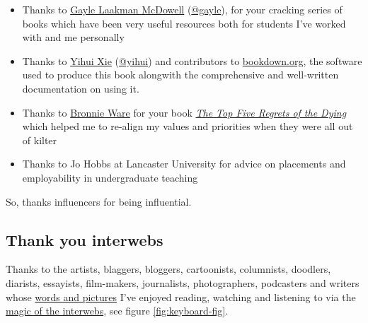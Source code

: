 \documentclass[
]{book}
\providecommand{\tightlist}{%
  \setlength{\itemsep}{0pt}\setlength{\parskip}{0pt}}
\begin{document}
\begin{itemize}
\tightlist
\item
  Thanks to \href{https://en.wikipedia.org/wiki/Gayle_Laakmann_McDowell}{Gayle Laakman McDowell} (\href{https://twitter.com/gayle}{@gayle}), for your cracking series of books \citep{techcareer, cracking, crackingpm, crackingthepmcareer} which have been very useful resources both for students I've worked with and me personally
\item
  Thanks to \href{https://en.wikipedia.org/wiki/Yihui_Xie}{Yihui Xie} (\href{https://github.com/yihui}{@yihui}) and contributors to \href{https://bookdown.org}{bookdown.org}, the software used to produce this book alongwith the comprehensive and well-written documentation on using it. \citep{xie2017, xie2015, xie2020}
\item
  Thanks to \href{https://en.wikipedia.org/wiki/Bronnie_Ware}{Bronnie Ware} for your book \emph{\href{https://en.wikipedia.org/wiki/The_Top_Five_Regrets_of_the_Dying}{The Top Five Regrets of the Dying}} \citep{regrets} which helped me to re-align my values and priorities when they were all out of kilter
\item
  Thanks to Jo Hobbs at Lancaster University for advice on placements and employability in undergraduate teaching
\end{itemize}

So, thanks influencers for being influential. 🙏

\hypertarget{bloggers}{%
\subsection{Thank you interwebs}\label{bloggers}}

Thanks to the artists, blaggers, bloggers, cartoonists, columnists, doodlers, diarists, essayists, film-makers, journalists, photographers, podcasters and writers whose \href{https://en.wikipedia.org/wiki/Words_and_Pictures_(TV_programme)}{words and pictures} I've enjoyed reading, watching and listening to via the \href{https://en.wiktionary.org/wiki/interweb}{magic of the interwebs}, see figure \ref{fig:keyboard-fig}.
\end{document}

